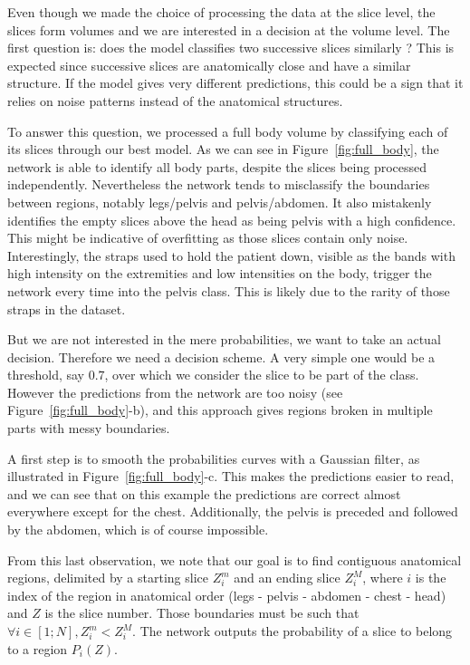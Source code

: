 Even though we made the choice of processing the data at the slice level, the slices form volumes and we are interested in a decision at the volume level. The first question is: does the model classifies two successive slices similarly ? This is expected since successive slices are anatomically close and have a similar structure. If the model gives very different predictions, this could be a sign that it relies on noise patterns instead of the anatomical structures.

To answer this question, we processed a full body volume by classifying each of its slices through our best model. 
As we can see in Figure~\ref{fig:full_body}, the network is able to identify all body parts, despite the slices being processed independently. Nevertheless the network tends to misclassify the boundaries between regions, notably legs/pelvis and pelvis/abdomen. It also mistakenly identifies the empty slices above the head as being pelvis with a high confidence. This might be indicative of overfitting as those slices contain only noise. Interestingly, the straps used to hold the patient down, visible as the bands with high intensity on the extremities and low intensities on the body, trigger the network every time into the pelvis class. This is likely due to the rarity of those straps in the dataset.

But we are not interested in the mere probabilities, we want to take an actual decision. Therefore we need a decision scheme. A very simple one would be a threshold, say $0.7$, over which we consider the slice to be part of the class. However the predictions from the network are too noisy (see Figure~\ref{fig:full_body}-b), and this approach gives regions broken in multiple parts with messy boundaries.

A first step is to smooth the probabilities curves with a Gaussian filter, as illustrated in Figure~\ref{fig:full_body}-c. This makes the predictions easier to read, and we can see that on this example the predictions are correct almost everywhere except for the chest. Additionally, the pelvis is preceded and followed by the abdomen, which is of course impossible.

From this last observation, we note that our goal is to find contiguous anatomical regions, delimited by a starting slice $Z^m_i$ and an ending slice $Z^M_i$, where $i$ is the index of the region in anatomical order (legs - pelvis - abdomen - chest - head) and $Z$ is the slice number. Those boundaries must be such that $\forall i \in [1; N], Z^m_i < Z^M_i$. The network outputs the probability of a slice to belong to a region $P_i \left( Z \right)$.

